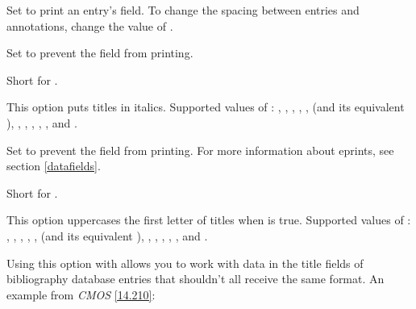 \documentclass[11pt,letterpaper,oneside]{article}
\begin{document}
\begin{optionlist}


\noindent Set  to print an entry's 
field. To change the spacing between entries and annotations, change
the value of .


\noindent Set  to prevent the  field from
printing.


\noindent Short for .


\noindent This option puts titles in italics. Supported values of
: , ,
, , ,
 (and its equivalent ),
, , ,
, , and
.


\noindent Set  to prevent the  field from
printing. For more information about eprints, see section
\ref{datafields}.


\noindent Short for .


\noindent This option uppercases the first letter of titles when
 is true. Supported values of :
, , ,
, ,  (and
its equivalent ), ,
, , ,
, and .

Using this option with  allows you to work with
data in the title fields of bibliography database entries that
shouldn't all receive the same format. An example from \textit{CMOS}
\ref{14.210}:


\end{optionlist}
\end{document}
